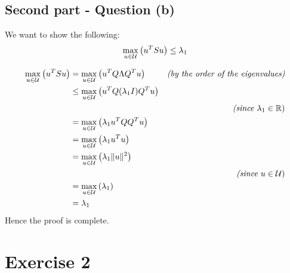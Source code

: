 \documentclass[12pt]{article}
\begin{document}
\subsection{Second part - Question (b)}
We want to show the following:
\[
    \max _{u \in \mathcal{U}}\left(u^{T} S u\right) \leq \lambda_{1}
\]

\begin{align*}
    \max _{u \in \mathcal{U}}\left( u^{T} S u \right)
     & = \max _{u \in \mathcal{U}} \left( u^{T} Q \Lambda Q^T u \right)
     & \textit{(by the order of the eigenvalues)}                       \\
     & \leq \max _{u \in \mathcal{U}} \left( u^{T} Q (\lambda_1 I) Q^T u \right) \\
     &
     & \textit{(since } \lambda_1 \in \mathbb{R})                               \\
     & = \max _{u \in \mathcal{U}} \left( \lambda_1 u^{T} Q Q^T u \right)        \\
     & = \max _{u \in \mathcal{U}} \left( \lambda_1 u^{T} u \right)              \\
     & = \max _{u \in \mathcal{U}} \left( \lambda_1 \| u \|^2 \right)            \\
     &
     & \textit{(since } u \in \mathcal{U})                                       \\
     & = \max _{u \in \mathcal{U}} \left( \lambda_1 \right)                      \\
     & = \lambda_{1}
\end{align*}
Hence the proof is complete.

\section{Exercise 2}
\end{document}
